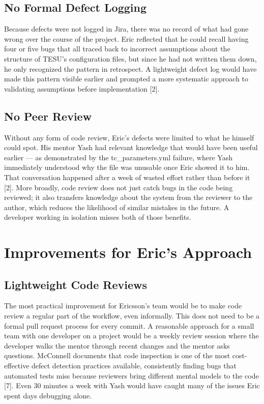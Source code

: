 \documentclass[sigconf]{acmart}
\begin{document}
\subsection{No Formal Defect Logging}

Because defects were not logged in Jira, there was no record of what had gone wrong over the course of the project. Eric reflected that he could recall having four or five bugs that all traced back to incorrect assumptions about the structure of TESU's configuration files, but since he had not written them down, he only recognized the pattern in retrospect. A lightweight defect log would have made this pattern visible earlier and prompted a more systematic approach to validating assumptions before implementation [2].

\subsection{No Peer Review}

Without any form of code review, Eric's defects were limited to what he himself could spot. His mentor Yash had relevant knowledge that would have been useful earlier — as demonstrated by the tc\_parameters.yml failure, where Yash immediately understood why the file was unusable once Eric showed it to him. That conversation happened after a week of wasted effort rather than before it [2]. More broadly, code review does not just catch bugs in the code being reviewed; it also transfers knowledge about the system from the reviewer to the author, which reduces the likelihood of similar mistakes in the future. A developer working in isolation misses both of those benefits.

\section{Improvements for Eric's Approach}

\subsection{Lightweight Code Reviews}

The most practical improvement for Ericsson's team would be to make code review a regular part of the workflow, even informally. This does not need to be a formal pull request process for every commit. A reasonable approach for a small team with one developer on a project would be a weekly review session where the developer walks the mentor through recent changes and the mentor asks questions. McConnell documents that code inspection is one of the most cost-effective defect detection practices available, consistently finding bugs that automated tests miss because reviewers bring different mental models to the code [7]. Even 30 minutes a week with Yash would have caught many of the issues Eric spent days debugging alone.
\end{document}
